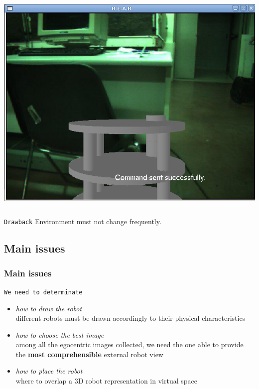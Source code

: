 {\begin{columns}
     {
      \includegraphics[width=\textwidth]{img/virtual_exocentric.png}
    }
    
  \end{columns}
  
  \pause
  
  \begin{block} {\alert{\texttt{Drawback}}}
    Environment must not change frequently.
  \end{block}


}

\subsection{Main issues}
\frame
{
  \frametitle{Main issues}


  
  \begin{block} {\alert{\texttt{We need to determinate}}}
    
    \pause
    
    \begin{itemize}
      
    \item \alert{\textit{how to draw the robot}} \\
      different robots must be drawn accordingly to
      their physical characteristics
      \pause
      
    \item \alert{\textit{how to choose the best image}} \\
      among all the egocentric images collected, we need
      the one able to provide the \textbf{most
      comprehensible} external robot view
      \pause
      
    \item \alert{\textit{how to place the robot}} \\
      where to overlap a 3D robot representation
      in virtual space
    \end{itemize}
    
  \end{block}
}
